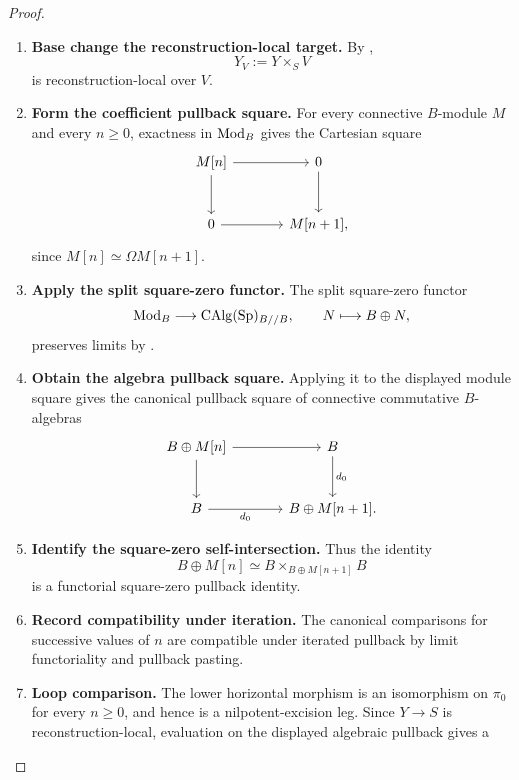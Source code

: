\begin{proof}
\leavevmode
\begin{enumerate}[label=\textup{(\arabic*)}]
    \item \textbf{Base change the reconstruction-local target.}
    By ,
    \[
        Y_V:=Y\times_SV
    \]
    is reconstruction-local over \(V\).
    \item \textbf{Form the coefficient pullback square.}
    For every connective \(B\)-module \(M\)
    and every \(n\geq0\), exactness in \(\operatorname{Mod}_B\) gives the Cartesian square
    \[
    \begin{tikzcd}[column sep=large,row sep=large]
        M[n] \arrow[r] \arrow[d]
            & 0 \arrow[d]
        \\
        0 \arrow[r]
            & M[n+1],
    \end{tikzcd}
    \]
    since \(M[n]\simeq\Omega M[n+1]\).
    \item \textbf{Apply the split square-zero functor.}
    The split square-zero functor
    \[
        \operatorname{Mod}_B\longrightarrow\operatorname{CAlg}(\operatorname{Sp})_{B//B},
        \qquad
        N\longmapsto B\oplus N,
    \]
    preserves limits by
    .
    \item \textbf{Obtain the algebra pullback square.}
    Applying it to the displayed
    module square gives the canonical pullback square of connective commutative
    \(B\)-algebras
    \[
    \begin{tikzcd}[column sep=large,row sep=large]
        B\oplus M[n] \arrow[r] \arrow[d]
            & B \arrow[d,"d_0"]
        \\
        B \arrow[r,"d_0"']
            & B\oplus M[n+1].
    \end{tikzcd}
    \]
    \item \textbf{Identify the square-zero self-intersection.}
    Thus the identity
    \[
        B\oplus M[n]
        \simeq
        B\times_{B\oplus M[n+1]}B
    \]
    is a functorial square-zero pullback identity.
    \item \textbf{Record compatibility under iteration.}
    The canonical comparisons
    for successive values of \(n\) are compatible under iterated pullback by
    limit functoriality and pullback pasting.
    \item \textbf{Loop comparison.}
    The lower horizontal morphism is an isomorphism on \(\pi_0\) for every
    \(n\geq0\), and hence is a nilpotent-excision leg. Since \(Y\to S\) is
    reconstruction-local, evaluation on the displayed algebraic pullback gives a

\end{enumerate}
\end{proof}
